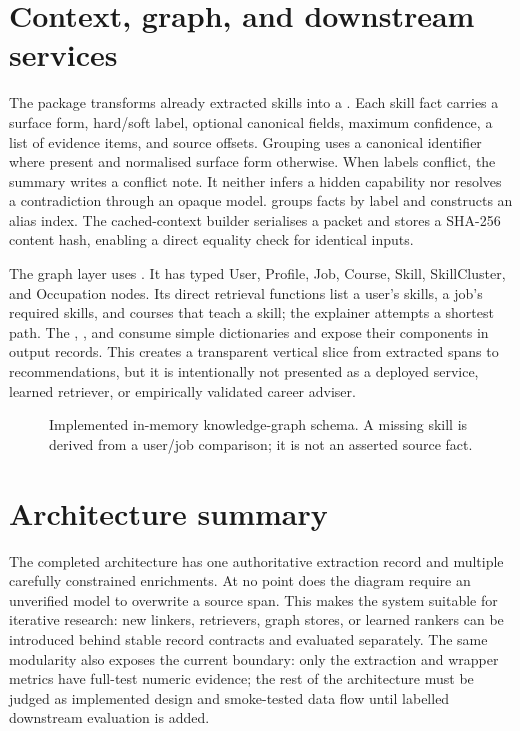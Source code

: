 \section{Context, graph, and downstream services}

The  package transforms already extracted skills into a . Each skill fact carries a surface form, hard/soft label, optional canonical fields, maximum confidence, a list of evidence items, and source offsets. Grouping uses a canonical identifier where present and normalised surface form otherwise. When labels conflict, the summary writes a conflict note. It neither infers a hidden capability nor resolves a contradiction through an opaque model.  groups facts by label and constructs an alias index. The cached-context builder serialises a packet and stores a SHA-256 content hash, enabling a direct equality check for identical inputs.

The graph layer uses . It has typed User, Profile, Job, Course, Skill, SkillCluster, and Occupation nodes. Its direct retrieval functions list a user's skills, a job's required skills, and courses that teach a skill; the explainer attempts a shortest path. The , , and  consume simple dictionaries and expose their components in output records. This creates a transparent vertical slice from extracted spans to recommendations, but it is intentionally not presented as a deployed service, learned retriever, or empirically validated career adviser.

\begin{figure}[H]
\centering

\caption{Implemented in-memory knowledge-graph schema. A missing skill is derived from a user/job comparison; it is not an asserted source fact.}
\label{fig:graph}
\end{figure}

\section{Architecture summary}

The completed architecture has one authoritative extraction record and multiple carefully constrained enrichments. At no point does the diagram require an unverified model to overwrite a source span. This makes the system suitable for iterative research: new linkers, retrievers, graph stores, or learned rankers can be introduced behind stable record contracts and evaluated separately. The same modularity also exposes the current boundary: only the extraction and wrapper metrics have full-test numeric evidence; the rest of the architecture must be judged as implemented design and smoke-tested data flow until labelled downstream evaluation is added.
